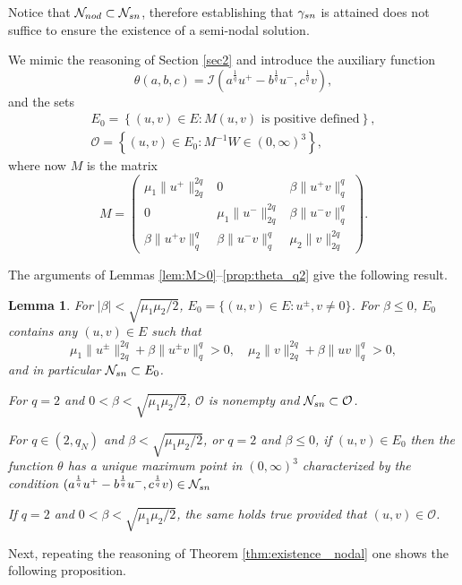 \documentclass[10pt,a4paper]{amsart}
\numberwithin{equation}{section}
\newtheorem{lemma}[theo]{Lemma}
\begin{document}
Notice that $\mathcal N_{\rm nod}\subset \mathcal N_{\rm sn}$, therefore establishing
that $\gamma_{\rm sn}$ is attained  does not suffice  to ensure the existence of a
semi-nodal solution.

We mimic the reasoning of Section \ref{sec2} and introduce the auxiliary function
\[
\theta(a,b,c)=\mathcal I (a^{\frac{1}{q}} u^+
 - b^{\frac{1}{q}}u^-, c^{\frac{1}{q}} v),
 \]
and the sets
\begin{gather*}
 E_0 = \left\{ (u,v)\in E : M(u,v) \text{ is positive defined}\right\},
\\
  \mathcal O = \left\{ (u,v) \in E_0 :  M^{-1} W \in (0,\infty)^3\right\} ,
\end{gather*}
where now $M$ is the matrix
\[
M=\begin{pmatrix} \mu_1\|u^+\|_{2q}^{2q} & 0 & \beta \|u^+v\|_q^q \\
 0&  \mu_1\|u^-\|_{2q}^{2q} & \beta \|u^-v\|_q^q \\
 \beta \|u^+v\|_q^q & \beta \|u^-v\|_q^q &  \mu_2 \|v\|_{2q}^{2q}
\end{pmatrix} .
\]

The arguments of Lemmas \ref{lem:M>0}--\ref{prop:theta_q2}
give the following result.

\begin{lemma}\label{lem:snod}
For $|\beta|<\sqrt{\mu_1\mu_2/2}$,  $E_0=\{ (u,v) \in E : u^{\pm}, v \neq 0\}$.
For $\beta \le 0$,  $E_0$ contains any $(u,v)\in E$ such that
\begin{equation*}
\mu_1 \|u^{\pm}\|_{2q}^{2q} + \beta \|u^{\pm} v\|_{q}^q>0, \quad
\mu_2 \|v\|_{2q}^{2q} +\beta \|u v\|_{q}^q >0,
\end{equation*}
and in particular $\mathcal N_{\rm sn}\subset E_0$.

For $q=2$ and $0<\beta < \sqrt{\mu_1\mu_2/2}$, $\mathcal O$ is nonempty and
 $\mathcal N_{\rm sn}\subset \mathcal O$.

For $q\in (2,q_N)$ and $\beta<\sqrt{\mu_1\mu_2/2}$, or $q=2$ and $\beta \le 0$,
if $(u,v)\in  E_0$ then the function
$\theta$ has a unique maximum point in $ (0,\infty)^3$ characterized by the condition
$(a^{\frac{1}q} u^+ -b^{\frac{1}q} u^-, c^{\frac{1}q} v) \in \mathcal N_{\rm sn}$

If $q=2$ and $0<\beta< \sqrt{\mu_1\mu_2/2}$, the same holds true provided that
$(u,v)\in \mathcal O$.
\end{lemma}

Next, repeating the reasoning of Theorem \ref{thm:existence_ nodal} one shows
the following proposition.
\end{document}
